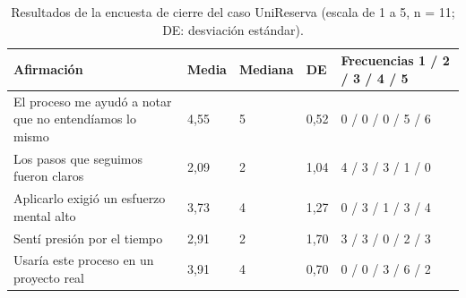 \documentclass[12pt,letterpaper,oneside]{report}
\begin{document}
\begin{table}[H]
\caption{Resultados de la encuesta de cierre del caso UniReserva (escala de 1 a
5, n = 11; DE: desviación estándar).}
\label{tab:encuesta}
\centering
\footnotesize
\renewcommand{\arraystretch}{1.15}
\begin{tabularx}{\textwidth}{@{}Y L{1.1cm} L{1.7cm} L{0.9cm} L{2.9cm}@{}}
\toprule
\textbf{Afirmación} & \textbf{Media} & \textbf{Mediana} & \textbf{DE} &
\textbf{Frecuencias 1 / 2 / 3 / 4 / 5} \\
\midrule
El proceso me ayudó a notar que no entendíamos lo mismo & 4,55 & 5 & 0,52 & 0 / 0 / 0 / 5 / 6 \\
Los pasos que seguimos fueron claros & 2,09 & 2 & 1,04 & 4 / 3 / 3 / 1 / 0 \\
Aplicarlo exigió un esfuerzo mental alto & 3,73 & 4 & 1,27 & 0 / 3 / 1 / 3 / 4 \\
Sentí presión por el tiempo & 2,91 & 2 & 1,70 & 3 / 3 / 0 / 2 / 3 \\
Usaría este proceso en un proyecto real & 3,91 & 4 & 0,70 & 0 / 0 / 3 / 6 / 2 \\
\bottomrule
\end{tabularx}
\end{table}
\end{document}
